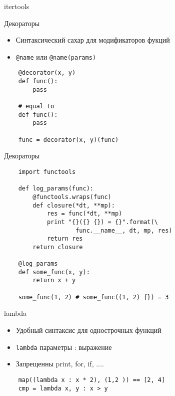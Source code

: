 \documentclass{article}
\begin{document}
{\center itertools}
\newpage

{\center Декораторы}
\begin{itemize}
    \item Синтаксический сахар для модификаторов фукций
    \item \lstinline!@name! или \lstinline!@name(params)!
\end{itemize}
\vspace{15pt}
\begin{lstlisting}
    @decorator(x, y)
    def func():
        pass

    # equal to
    def func():
        pass

    func = decorator(x, y)(func)
\end{lstlisting}
\newpage

{\center Декораторы}
\vspace{15pt}
\begin{lstlisting}
    import functools

    def log_params(func):
        @functools.wraps(func)
        def closure(*dt, **mp):
            res = func(*dt, **mp)
            print "{}({} {}) = {}".format(\
                    func.__name__, dt, mp, res)
            return res
        return closure

    @log_params
    def some_func(x, y):
        return x + y

    some_func(1, 2) # some_func((1, 2) {}) = 3
\end{lstlisting}
\newpage

{\center lambda}
\begin{itemize}
    \item Удобный синтаксис для однострочных функций
    \item \lstinline!lambda! параметры : выражение
    \item Запрещенны print, for, if, ....
\end{itemize}
\vspace{15pt}
\begin{lstlisting}
    map((lambda x : x * 2), (1,2 )) == [2, 4]
    cmp = lambda x, y : x > y
\end{lstlisting}
\newpage
\end{document}
